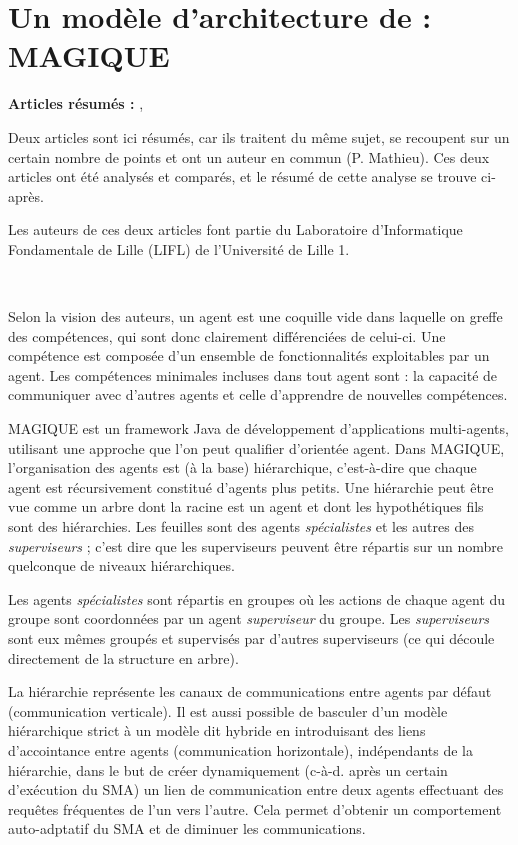 \section{Un modèle d'architecture de  : MAGIQUE}
\textbf{Articles résumés :} \cite{m1}, \cite{m2}

Deux articles sont ici résumés, car ils traitent du même sujet, se recoupent sur un certain nombre de points et ont un auteur en commun (P. Mathieu). Ces deux articles ont été analysés et comparés, et le résumé de cette analyse se trouve ci-après.



Les auteurs de ces deux articles font partie du Laboratoire d'Informatique Fondamentale de Lille (LIFL) de l'Université de Lille 1.

~

Selon la vision des auteurs, un agent est une \og{}coquille vide\fg{} dans laquelle on greffe des compétences, qui sont donc clairement différenciées de celui-ci. Une compétence est composée d'un ensemble de fonctionnalités exploitables par un agent. Les compétences minimales incluses dans tout agent sont : la capacité de communiquer avec d'autres agents et celle d'apprendre de nouvelles compétences.

MAGIQUE est un framework Java de développement d'applications multi-agents, utilisant une approche que l'on peut qualifier d'\og{}orientée agent\fg{}. Dans MAGIQUE, l'organisation des agents est (à la base) hiérarchique, c'est-à-dire que chaque agent est récursivement constitué d'agents plus petits. Une hiérarchie peut être vue comme un arbre dont la racine est un agent et dont les hypothétiques fils sont des hiérarchies. Les feuilles sont des agents \emph{spécialistes} et les autres des \emph{superviseurs} ; c'est dire que les superviseurs peuvent être répartis sur un nombre quelconque de niveaux hiérarchiques.

Les agents \emph{spécialistes} sont répartis en groupes où les actions de chaque agent du groupe sont coordonnées par un agent \emph{superviseur} du groupe. Les \emph{superviseurs} sont eux mêmes groupés et supervisés par d'autres superviseurs (ce qui découle directement de la structure en arbre).

La hiérarchie représente les canaux de communications entre agents par défaut (communication verticale). Il est aussi possible de basculer d'un modèle hiérarchique strict à un modèle dit \og{}hybride\fg{} en introduisant des liens d'\og{}accointance\fg{} entre agents (communication horizontale), indépendants de la hiérarchie, dans le but de créer dynamiquement (c-à-d. après un certain d'exécution du SMA) un lien de communication entre deux agents effectuant des requêtes fréquentes de l'un vers l'autre. Cela permet d'obtenir un comportement auto-adptatif du SMA et de diminuer les communications.

